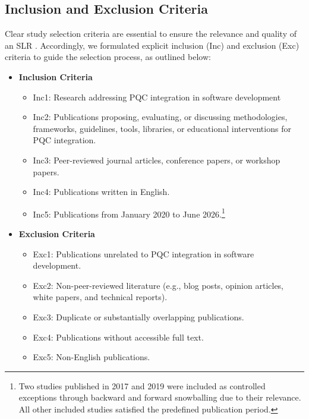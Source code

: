 \documentclass[letterpaper,twocolumn,10pt]{article}
\begin{document}
\subsection{Inclusion and Exclusion Criteria}
\label{InEXList}

Clear study selection criteria are essential to ensure the relevance and quality of an SLR \cite{booth_systematic_2016}. Accordingly, we formulated explicit inclusion (Inc) and exclusion (Exc) criteria to guide the selection process, as outlined below:

\begin{itemize}
  \item \textbf{Inclusion Criteria}
      \begin{itemize}
       \item Inc1: Research addressing PQC integration in software development
        \item Inc2: Publications proposing, evaluating, or discussing methodologies, frameworks, guidelines, tools, libraries, or educational interventions for PQC integration.
        \item Inc3: Peer-reviewed journal articles, conference papers, or workshop papers.
        \item Inc4: Publications written in English.
        \item Inc5: Publications from January 2020 to June 2026.\footnote{Two studies published in 2017 and 2019 were included as controlled exceptions through backward and forward snowballing due to their relevance. All other included studies satisfied the predefined publication period.}
      \end{itemize}

  \item \textbf{Exclusion Criteria}
      \begin{itemize}
        \item Exc1: Publications unrelated to PQC integration in software development.
        \item Exc2: Non-peer-reviewed literature (e.g., blog posts, opinion articles, white papers, and technical reports).
        \item Exc3: Duplicate or substantially overlapping publications.
        \item Exc4: Publications without accessible full text.
        \item Exc5: Non-English publications.
      \end{itemize}
\end{itemize}


\end{document}

